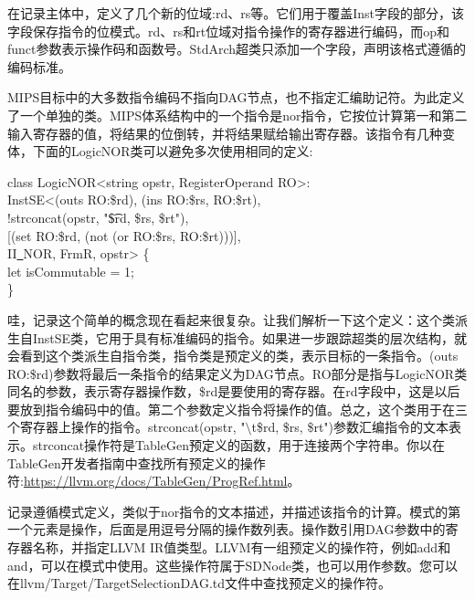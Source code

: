 在记录主体中，定义了几个新的位域:rd、rs等。它们用于覆盖Inst字段的部分，该字段保存指令的位模式。rd、rs和rt位域对指令操作的寄存器进行编码，而op和funct参数表示操作码和函数号。StdArch超类只添加一个字段，声明该格式遵循的编码标准。\par

MIPS目标中的大多数指令编码不指向DAG节点，也不指定汇编助记符。为此定义了一个单独的类。MIPS体系结构中的一个指令是nor指令，它按位计算第一和第二输入寄存器的值，将结果的位倒转，并将结果赋给输出寄存器。该指令有几种变体，下面的LogicNOR类可以避免多次使用相同的定义:\par

\begin{tcolorbox}[colback=white,colframe=black]
class LogicNOR<string opstr, RegisterOperand RO>: \\
\hspace*{0.5cm}InstSE<(outs RO:\$rd), (ins RO:\$rs, RO:\$rt), \\
\hspace*{3cm}!strconcat(opstr, "\t\$rd, \$rs, \$rt"), \\
\hspace*{3cm}[(set RO:\$rd, (not (or RO:\$rs, RO:\$rt)))], \\
\hspace*{3cm}II\underline{~}NOR, FrmR, opstr> \{ \\
\hspace*{0.5cm}let isCommutable = 1; \\
\}
\end{tcolorbox}

哇，记录这个简单的概念现在看起来很复杂。让我们解析一下这个定义：这个类派生自InstSE类，它用于具有标准编码的指令。如果进一步跟踪超类的层次结构，就会看到这个类派生自指令类，指令类是预定义的类，表示目标的一条指令。(outs RO:\$rd)参数将最后一条指令的结果定义为DAG节点。RO部分是指与LogicNOR类同名的参数，表示寄存器操作数，\$rd是要使用的寄存器。在rd字段中，这是以后要放到指令编码中的值。第二个参数定义指令将操作的值。总之，这个类用于在三个寄存器上操作的指令。strconcat(opstr, "$\setminus$t\$rd, \$rs, \$rt")参数汇编指令的文本表示。strconcat操作符是TableGen预定义的函数，用于连接两个字符串。你以在TableGen开发者指南中查找所有预定义的操作符:\url{https://llvm.org/docs/TableGen/ProgRef.html}。\par

记录遵循模式定义，类似于nor指令的文本描述，并描述该指令的计算。模式的第一个元素是操作，后面是用逗号分隔的操作数列表。操作数引用DAG参数中的寄存器名称，并指定LLVM IR值类型。LLVM有一组预定义的操作符，例如add和and，可以在模式中使用。这些操作符属于SDNode类，也可以用作参数。您可以在llvm/Target/TargetSelectionDAG.td文件中查找预定义的操作符。\par

